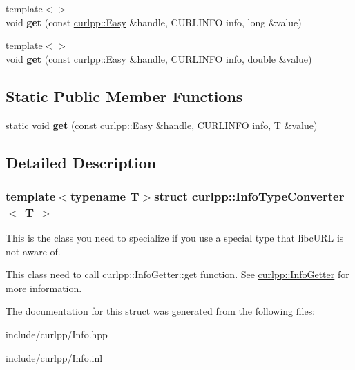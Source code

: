 \begin{DoxyCompactItemize}
\item 
\hypertarget{structcurlpp_1_1InfoTypeConverter_a48e3a20c163ac20a147a1ada5a48fffc}{{\footnotesize template$<$$>$ }\\void {\bfseries get} (const \hyperlink{classcurlpp_1_1Easy}{curlpp\-::\-Easy} \&handle, C\-U\-R\-L\-I\-N\-F\-O info, long \&value)}\label{structcurlpp_1_1InfoTypeConverter_a48e3a20c163ac20a147a1ada5a48fffc}

\item 
\hypertarget{structcurlpp_1_1InfoTypeConverter_a899b6e658a62c02f9c808f3852c49c81}{{\footnotesize template$<$$>$ }\\void {\bfseries get} (const \hyperlink{classcurlpp_1_1Easy}{curlpp\-::\-Easy} \&handle, C\-U\-R\-L\-I\-N\-F\-O info, double \&value)}\label{structcurlpp_1_1InfoTypeConverter_a899b6e658a62c02f9c808f3852c49c81}

\end{DoxyCompactItemize}
\subsection*{Static Public Member Functions}
\begin{DoxyCompactItemize}
\item 
\hypertarget{structcurlpp_1_1InfoTypeConverter_a674dfe95bc1a1607dbd5cfd056834837}{static void {\bfseries get} (const \hyperlink{classcurlpp_1_1Easy}{curlpp\-::\-Easy} \&handle, C\-U\-R\-L\-I\-N\-F\-O info, T \&value)}\label{structcurlpp_1_1InfoTypeConverter_a674dfe95bc1a1607dbd5cfd056834837}

\end{DoxyCompactItemize}


\subsection{Detailed Description}
\subsubsection*{template$<$typename T$>$struct curlpp\-::\-Info\-Type\-Converter$<$ T $>$}

This is the class you need to specialize if you use a special type that libc\-U\-R\-L is not aware of. 

This class need to call curlpp\-::\-Info\-Getter\-::get function. See \hyperlink{structcurlpp_1_1InfoGetter}{curlpp\-::\-Info\-Getter} for more information. 

The documentation for this struct was generated from the following files\-:\begin{DoxyCompactItemize}
\item 
include/curlpp/Info.\-hpp\item 
include/curlpp/Info.\-inl\end{DoxyCompactItemize}
